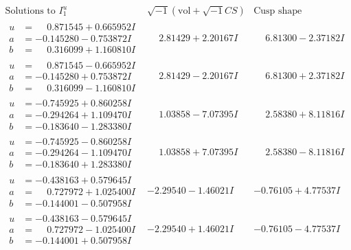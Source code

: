 \documentclass[1p]{elsarticle_modified}
\theoremstyle{definition}
\newcommand{\I}{\sqrt{-1}}
\begin{document}
$$\begin{array}{c|c|c}  
\text{Solutions to }I^u_{1}& \I (\text{vol} + \sqrt{-1}CS) & \text{Cusp shape}\\
 \hline 
\begin{aligned}
u &= \phantom{-}0.871545 + 0.665952 I \\
a &= -0.145280 - 0.753872 I \\
b &= \phantom{-}0.316099 + 1.160810 I\end{aligned}
 & \phantom{-}2.81429 + 2.20167 I & \phantom{-}6.81300 - 2.37182 I \\ \hline\begin{aligned}
u &= \phantom{-}0.871545 - 0.665952 I \\
a &= -0.145280 + 0.753872 I \\
b &= \phantom{-}0.316099 - 1.160810 I\end{aligned}
 & \phantom{-}2.81429 - 2.20167 I & \phantom{-}6.81300 + 2.37182 I \\ \hline\begin{aligned}
u &= -0.745925 + 0.860258 I \\
a &= -0.294264 + 1.109470 I \\
b &= -0.183640 - 1.283380 I\end{aligned}
 & \phantom{-}1.03858 - 7.07395 I & \phantom{-}2.58380 + 8.11816 I \\ \hline\begin{aligned}
u &= -0.745925 - 0.860258 I \\
a &= -0.294264 - 1.109470 I \\
b &= -0.183640 + 1.283380 I\end{aligned}
 & \phantom{-}1.03858 + 7.07395 I & \phantom{-}2.58380 - 8.11816 I \\ \hline\begin{aligned}
u &= -0.438163 + 0.579645 I \\
a &= \phantom{-}0.727972 + 1.025400 I \\
b &= -0.144001 - 0.507958 I\end{aligned}
 & -2.29540 - 1.46021 I & -0.76105 + 4.77537 I \\ \hline\begin{aligned}
u &= -0.438163 - 0.579645 I \\
a &= \phantom{-}0.727972 - 1.025400 I \\
b &= -0.144001 + 0.507958 I\end{aligned}
 & -2.29540 + 1.46021 I & -0.76105 - 4.77537 I \\ \hline\begin{aligned}

\end{aligned}
\end{array}$$
\end{document}
